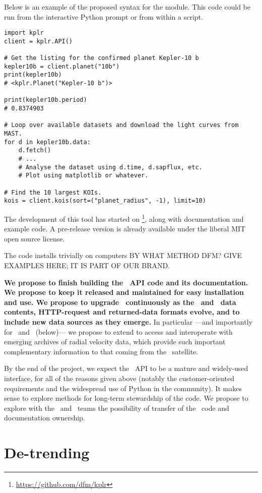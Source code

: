 \documentclass[letterpaper,12pt,preprint]{hack_aastex}
\newcommand{\kplr}{\package{kplr}}
\newcommand{\Bart}{\package{Bart}}
\newcommand{\TheCreator}{\package{TheCreator}}
\begin{document}
Below is an example of the proposed syntax for the module.
This code could be run from the interactive Python prompt or from within a
script.
\begin{lstlisting}
import kplr
client = kplr.API()

# Get the listing for the confirmed planet Kepler-10 b
kepler10b = client.planet("10b")
print(kepler10b)
# <kplr.Planet("Kepler-10 b")>

print(kepler10b.period)
# 0.8374903

# Loop over available datasets and download the light curves from MAST.
for d in kepler10b.data:
    d.fetch()
    # ...
    # Analyse the dataset using d.time, d.sapflux, etc.
    # Plot using matplotlib or whatever.

# Find the 10 largest KOIs.
kois = client.kois(sort=("planet_radius", -1), limit=10)
\end{lstlisting}

The development of this tool has started on %
\footnote{\url{https://github.com/dfm/kplr}},
along with documentation and example code.
A pre-release version is already available under the liberal MIT open source license.

The code installs trivially on computers BY WHAT METHOD DFM? GIVE EXAMPLES HERE; IT IS PART OF OUR BRAND.

\textbf{We propose to finish building the \kplr\ API code and its documentation.
We propose to keep it released and maintained for easy installation and use.
We propose to upgrade \kplr\ continuously as the \MAST\ and \EA\ data contents,
HTTP-request and returned-data formats evolve,
and to include new data sources as they emerge.}
In particular%
---and importantly for \Bart\ and \TheCreator\ (below)---%
we propose to extend \kplr to access and interoperate with
emerging archives of radial velocity data,
which provide such important complementary information to that coming from the \Kepler\ satellite.

By the end of the project,
we expect the \kplr\ API to be a mature and widely-used interface,
for all of the reasons given above
(notably the customer-oriented requirements and the widespread use of Python in the community).
It makes sense to explore methods for long-term stewardship of the code.
We propose to explore with the \MAST\ and \EA\ teams the possibility of transfer of the \kplr\ code and documentation ownership.

\section{De-trending}
\end{document}
